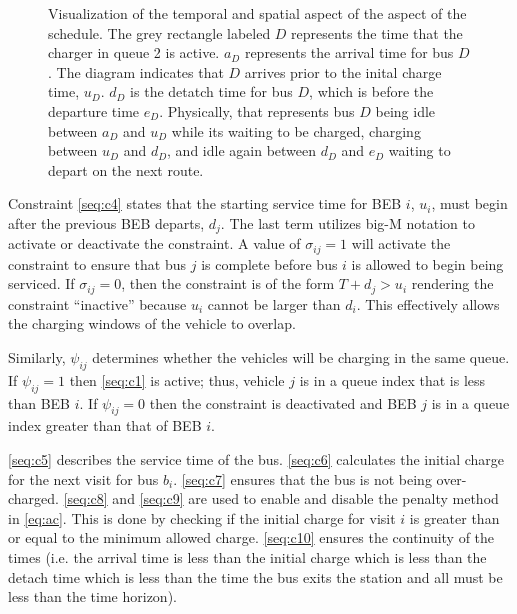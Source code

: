 \documentclass[11pt,a4paper,final]{article}
\begin{document}
\begin{figure}[ht!]
{{
  }}
  \caption{Visualization of the temporal and spatial aspect of the aspect of the schedule. The grey rectangle labeled $D$ represents the time that the charger in queue 2 is active. $a_D$ represents the arrival time for bus $D$. The diagram indicates that $D$ arrives prior to the inital charge time, $u_D$. $d_D$ is the detatch time for bus $D$, which is before the departure time $e_D$. Physically, that represents bus $D$ being idle between $a_D$ and $u_D$ while its waiting to be charged, charging between $u_D$ and $d_D$, and idle again between $d_D$ and $e_D$ waiting to depart on the next route.}
  \label{fig:spacial-and-temporal-constr}
\end{figure}

Constraint \ref{seq:c4} states that the starting service time for BEB \(i\), \(u_i\), must begin after the previous BEB
departs, \(d_j\). The last term utilizes big-M notation to activate or deactivate the constraint. A value of \(\sigma_{ij} = 1\)
will activate the constraint to ensure that bus \(j\) is complete before bus \(i\) is allowed to begin being serviced. If
\(\sigma_{ij} = 0\), then the constraint is of the form \(T + d_j > u_i\) rendering the constraint ``inactive'' because \(u_i\)
cannot be larger than \(d_i\). This effectively allows the charging windows of the vehicle to overlap.

Similarly, \(\psi_{ij}\) determines whether the vehicles will be charging in the same queue. If \(\psi_{ij} = 1\) then
\eqref{seq:c1} is active; thus, vehicle \(j\) is in a queue index that is less than BEB \(i\). If \(\psi_{ij} = 0\) then the
constraint is deactivated and BEB \(j\) is in a queue index greater than that of BEB \(i\).

\ref{seq:c5} describes the service time of the bus. \ref{seq:c6} calculates the initial charge for the next visit for
bus \(b_i\). \ref{seq:c7} ensures that the bus is not being over-charged. \ref{seq:c8} and \ref{seq:c9} are used to
enable and disable the penalty method in \ref{eq:ac}. This is done by checking if the initial charge for visit \(i\) is greater
than or equal to the minimum allowed charge. \ref{seq:c10} ensures the continuity of the times (i.e. the arrival time is
less than the initial charge which is less than the detach time which is less than the time the bus exits the station
and all must be less than the time horizon).
\end{document}
